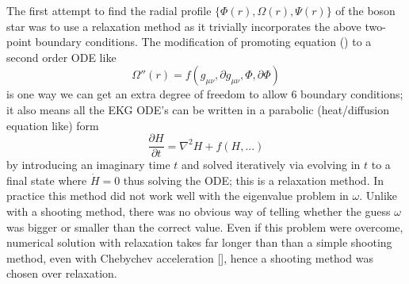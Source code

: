 The first attempt to find the radial profile $\{\Phi(r),\Omega(r),\Psi(r)\}$ of the boson star was to use a relaxation method as it trivially incorporates the above two-point boundary conditions. The modification of promoting equation () to a second order ODE like \begin{equation}\Omega''(r) = f(g_{\mu\nu},\partial g_{\mu\nu},\Phi,\partial \Phi)\end{equation}
is one way we can get an extra degree of freedom to allow 6 boundary conditions; it also means all the EKG ODE's can be written in a parabolic (heat/diffusion equation like) form
\begin{equation} \frac{\partial H}{\partial t}  = \nabla^2 H + f(H,...) \end{equation}
by introducing an imaginary time $t$ and solved iteratively via evolving in $t$ to a final state where $\dot{H}=0$ thus solving the ODE; this is a relaxation method. In practice this method did not work well with the eigenvalue problem in $\omega$. Unlike with a shooting method, there was no obvious way of telling whether the guess $\omega$ was bigger or smaller than the correct value. Even if this problem were overcome, numerical solution with relaxation takes far longer than than a simple shooting method, even with Chebychev acceleration [], hence a shooting method was chosen over relaxation.

